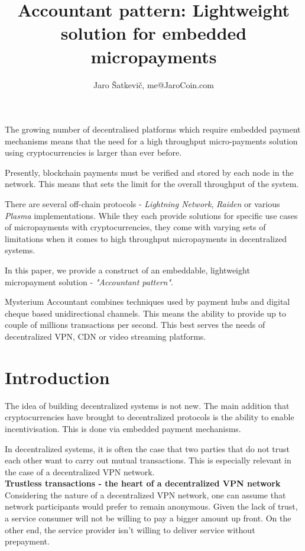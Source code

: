 \documentclass[a4paper,12pt]{article}
\title{Accountant pattern: Lightweight solution for embedded micropayments}
\author{Jaro Šatkevič, me@JaroCoin.com}
\begin{document}
\maketitle

The growing number of decentralised platforms which require embedded payment 
mechanisms means that the need for a high throughput micro-payments solution 
using cryptocurrencies is larger than ever before. 

Presently, blockchain payments must be verified and stored by each node in the 
network. This means that sets the limit for the overall throughput of the system.

There are several off-chain protocols - \textit{Lightning Network}, \textit{Raiden}
or various \textit{Plasma} implementations. While they each provide solutions for 
specific use cases of micropayments with cryptocurrencies, they come with varying 
sets of limitations when it comes to high throughput micropayments in decentralized 
systems. 

In this paper, we provide a construct of an embeddable, lightweight micropayment 
solution - \textit{"Accountant pattern"}.

Mysterium Accountant combines techniques used by payment hubs and digital cheque 
based unidirectional channels. This means the ability to provide up to couple of
millions transactions per second. This best serves the needs of decentralized VPN, 
CDN or video streaming platforms. 


\newpage
\tableofcontents
\newpage

\section{Introduction}

The idea of building decentralized systems is not new. The main addition that 
cryptocurrencies have brought to decentralized protocols is the ability to enable 
incentivisation. This is done via embedded payment mechanisms. 

In decentralized systems, it is often the case that two parties that do not trust 
each other want to carry out mutual transactions. This is especially relevant in 
the case of a decentralized VPN network. \\

\textbf{Trustless transactions - the heart of a decentralized VPN network} \\

Considering the nature of a decentralized VPN network, one can assume that network
participants would prefer to remain anonymous. Given the lack of trust, a service 
consumer will not be willing to pay a bigger amount up front. On the other end, the 
service provider isn’t willing to deliver service without prepayment. 
\end{document}

